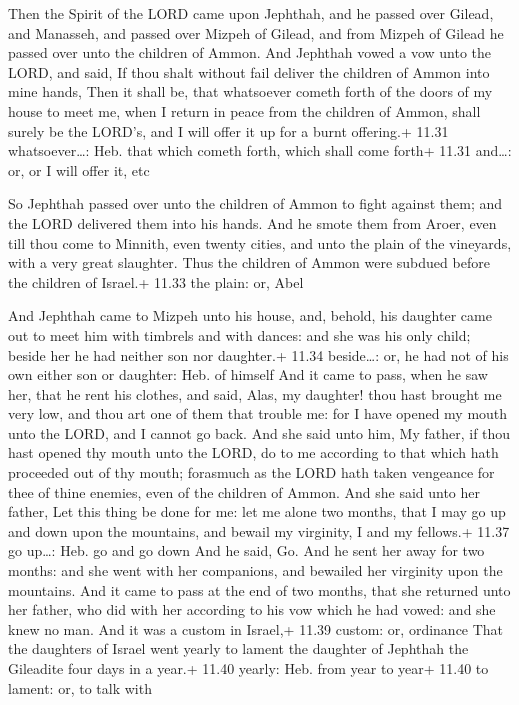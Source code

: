  Then the Spirit of the LORD came upon Jephthah, and he
passed over Gilead, and Manasseh, and passed over Mizpeh of Gilead, and
from Mizpeh of Gilead he passed over unto the children of Ammon.
 And Jephthah vowed a vow unto the LORD, and said, If thou
shalt without fail deliver the children of Ammon into mine hands,
 Then it shall be, that whatsoever cometh forth of the
doors of my house to meet me, when I return in peace from the children
of Ammon, shall surely be the LORD's, and I will offer it up for a burnt
offering.+ 11.31 whatsoever\ldots: Heb. that which cometh forth, which
shall come forth+ 11.31 and\ldots: or, or I will offer it, etc

 So Jephthah passed over unto the children of Ammon to
fight against them; and the LORD delivered them into his hands.
 And he smote them from Aroer, even till thou come to
Minnith, even twenty cities, and unto the plain of the vineyards, with a
very great slaughter. Thus the children of Ammon were subdued before the
children of Israel.+ 11.33 the plain: or, Abel

 And Jephthah came to Mizpeh unto his house, and, behold,
his daughter came out to meet him with timbrels and with dances: and she
was his only child; beside her he had neither son nor daughter.+ 11.34
beside\ldots: or, he had not of his own either son or daughter: Heb. of
himself  And it came to pass, when he saw her, that he rent
his clothes, and said, Alas, my daughter! thou hast brought me very low,
and thou art one of them that trouble me: for I have opened my mouth
unto the LORD, and I cannot go back.  And she said unto
him, My father, if thou hast opened thy mouth unto the LORD, do to me
according to that which hath proceeded out of thy mouth; forasmuch as
the LORD hath taken vengeance for thee of thine enemies, even of the
children of Ammon.  And she said unto her father, Let this
thing be done for me: let me alone two months, that I may go up and down
upon the mountains, and bewail my virginity, I and my fellows.+ 11.37 go
up\ldots: Heb. go and go down  And he said, Go. And he sent
her away for two months: and she went with her companions, and bewailed
her virginity upon the mountains.  And it came to pass at
the end of two months, that she returned unto her father, who did with
her according to his vow which he had vowed: and she knew no man. And it
was a custom in Israel,+ 11.39 custom: or, ordinance  That
the daughters of Israel went yearly to lament the daughter of Jephthah
the Gileadite four days in a year.+ 11.40 yearly: Heb. from year to
year+ 11.40 to lament: or, to talk with

